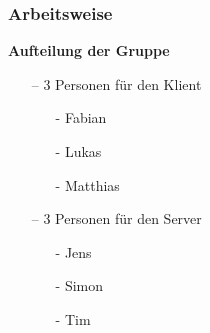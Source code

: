 \documentclass[aspectratio=1610]{beamer}
\begin{document}
    \begin{frame}[plain]
        \frametitle{\textbf{Arbeitsweise}}
            \textbf{Aufteilung der Gruppe}
            \begin{itemize}
                \setlength\itemsep{0.3em}
                \item[--] 3 Personen für den Klient
                    \begin{itemize}
                        \item[-] Fabian
                        \item[-] Lukas
                        \item[-] Matthias
                    \end{itemize}
                \item[--] 3 Personen für den Server
                    \begin{itemize}
                        \item[-] Jens
                        \item[-] Simon
                        \item[-] Tim
                    \end{itemize}
            \end{itemize}
    \end{frame}
\end{document}
